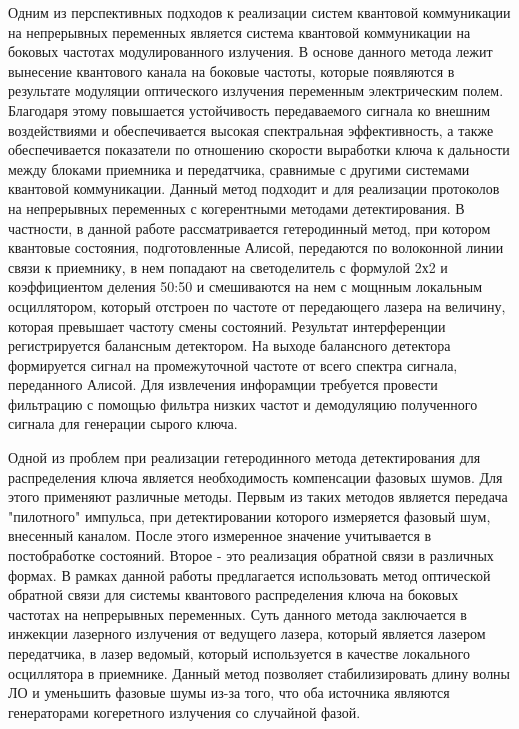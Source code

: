 Одним из перспективных подходов к реализации систем квантовой коммуникации на непрерывных переменных является система квантовой коммуникации на боковых частотах модулированного излучения. В основе данного метода лежит вынесение квантового канала на боковые частоты, которые появляются в результате модуляции оптического излучения переменным электрическим полем. Благодаря этому повышается устойчивость передаваемого сигнала ко внешним воздействиями и обеспечивается высокая спектральная эффективность, а также обеспечивается показатели по отношению скорости выработки ключа к дальности между блоками приемника и передатчика, сравнимые  с другими системами квантовой коммуникации. Данный метод подходит и для реализации протоколов на непрерывных переменных с когерентными методами детектирования. В частности, в данной работе рассматривается гетеродинный метод, при котором квантовые состояния, подготовленные Алисой, передаются по волоконной линии связи к приемнику, в нем попадают на светоделитель с формулой 2х2 и коэффициентом деления 50:50 и смешиваются на нем с мощнным локальным осциллятором, который отстроен по частоте от передающего лазера на величину, которая превышает частоту смены состояний. Результат интерференции регистрируется балансным детектором. На выходе балансного детектора формируется сигнал на промежуточной частоте от всего спектра сигнала, переданного Алисой. Для извлечения инфорамции требуется провести фильтрацию с помощью фильтра низких частот и демодуляцию полученного сигнала для генерации сырого ключа. 

Одной из проблем при реализации гетеродинного метода детектирования для распределения ключа является необходимость компенсации фазовых шумов. Для этого применяют различные методы. Первым из таких методов является передача "пилотного" импульса, при детектировании которого измеряется фазовый шум, внесенный каналом. После этого измеренное значение учитывается в постобработке состояний. Второе - это реализация обратной связи в различных формах. В рамках данной работы предлагается использовать метод оптической обратной связи для системы квантового распределения ключа на боковых частотах на непрерывных переменных. Суть данного метода заключается в инжекции лазерного излучения от ведущего лазера, который является лазером передатчика, в лазер ведомый, который используется в качестве локального осциллятора в приемнике. Данный метод позволяет стабилизировать длину волны ЛО и уменьшить фазовые шумы из-за того, что оба источника являются генераторами когеретного излучения со случайной фазой.

